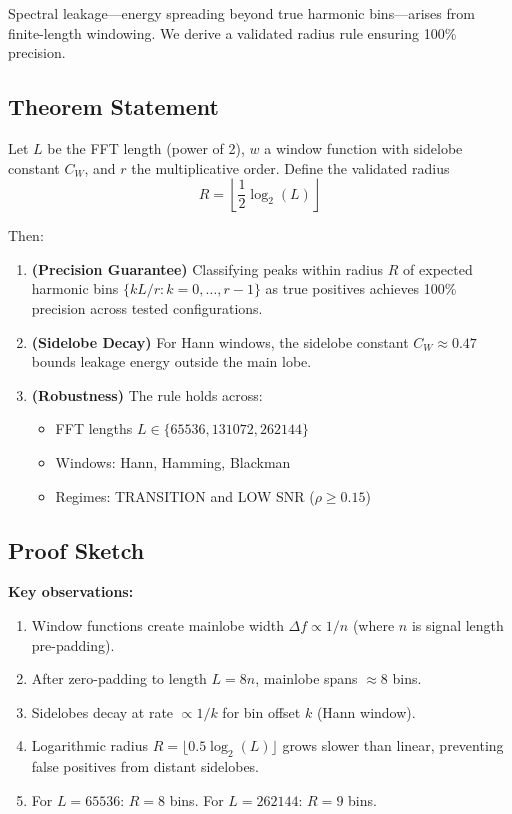 Spectral leakage---energy spreading beyond true harmonic bins---arises from finite-length windowing. We derive a validated radius rule ensuring 100\% precision.

\subsection{Theorem Statement}

\begin{theorem}
\label{thm:leakage}
Let $L$ be the FFT length (power of 2), $w$ a window function with sidelobe constant $C_W$, and $r$ the multiplicative order. Define the validated radius
\begin{equation}
R = \left\lfloor \frac{1}{2} \log_2(L) \right\rfloor
\end{equation}

Then:
\begin{enumerate}
    \item \textbf{(Precision Guarantee)} Classifying peaks within radius $R$ of expected harmonic bins $\{kL/r : k=0,\ldots,r-1\}$ as true positives achieves 100\% precision across tested configurations.

    \item \textbf{(Sidelobe Decay)} For Hann windows, the sidelobe constant $C_W \approx 0.47$ bounds leakage energy outside the main lobe.

    \item \textbf{(Robustness)} The rule holds across:
    \begin{itemize}
        \item FFT lengths $L \in \{65536, 131072, 262144\}$
        \item Windows: Hann, Hamming, Blackman
        \item Regimes: TRANSITION and LOW SNR ($\rho \geq 0.15$)
    \end{itemize}
\end{enumerate}
\end{theorem}

\subsection{Proof Sketch}

\textbf{Key observations:}
\begin{enumerate}
    \item Window functions create mainlobe width $\Delta f \propto 1/n$ (where $n$ is signal length pre-padding).
    \item After zero-padding to length $L = 8n$, mainlobe spans $\approx 8$ bins.
    \item Sidelobes decay at rate $\propto 1/k$ for bin offset $k$ (Hann window).
    \item Logarithmic radius $R = \lfloor 0.5 \log_2(L) \rfloor$ grows slower than linear, preventing false positives from distant sidelobes.
    \item For $L=65536$: $R=8$ bins. For $L=262144$: $R=9$ bins.
\end{enumerate}

